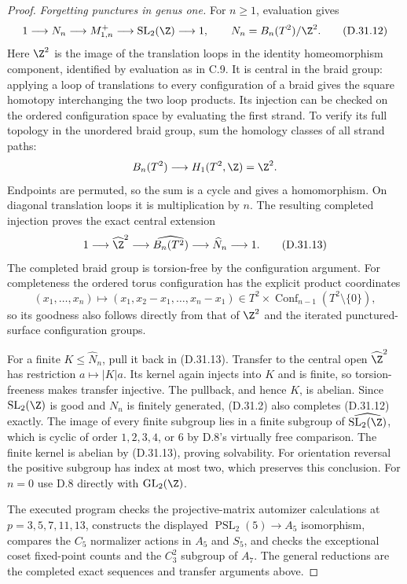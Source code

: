 \begin{proof}
\emph{Forgetting punctures in genus one.}
For $n\geq1$, evaluation gives
\[
 1\longrightarrow N_n\longrightarrow M_{1,n}^+
       \longrightarrow\operatorname{SL}_2(\Z)
       \longrightarrow1,\qquad
 N_n=B_n(T^2)/\Z^2.                                    \tag{D.31.12}
\]
Here $\Z^2$ is the image of the translation loops in the
identity homeomorphism component, identified by evaluation
as in C.9. It is central in the braid group: applying a loop
of translations to every configuration of a braid gives the
square homotopy interchanging the two loop products. Its injection
can be checked on the ordered configuration space by evaluating
the first strand. To verify its full topology in the unordered
braid group, sum the homology classes of all strand paths:
\[
 B_n(T^2)\longrightarrow H_1(T^2,\Z)=\Z^2.
\]
Endpoints are permuted, so the sum is a cycle and gives a
homomorphism. On diagonal translation loops it is multiplication
by $n$. The resulting completed injection proves the exact
central extension
\[
 1\longrightarrow\widehat\Z^2\longrightarrow
 \widehat{B_n(T^2)}\longrightarrow\widehat N_n
       \longrightarrow1.                              \tag{D.31.13}
\]
The completed braid group is torsion-free by the configuration
argument. For completeness the ordered torus configuration
has the explicit product coordinates
\[
 (x_1,\ldots,x_n)\longmapsto
 (x_1,x_2-x_1,\ldots,x_n-x_1)
 \in T^2\times\operatorname{Conf}_{n-1}(T^2\setminus\{0\}),
\]
so its goodness also follows directly from that of $\Z^2$
and the iterated punctured-surface configuration groups.

For a finite $K\leq\widehat N_n$, pull it back in (D.31.13).
Transfer to the central open $\widehat\Z^2$ has restriction
$a\mapsto |K|a$. Its kernel again injects into $K$ and is
finite, so torsion-freeness makes transfer injective.
The pullback, and hence $K$, is abelian. Since
$\operatorname{SL}_2(\Z)$ is good and $N_n$ is finitely
generated, (D.31.2) also completes (D.31.12) exactly.
The image of every finite subgroup lies in a finite subgroup
of $\widehat{\operatorname{SL}_2(\Z)}$, which is cyclic
of order $1,2,3,4$, or $6$ by D.8's virtually free comparison.
The finite kernel is abelian by (D.31.13), proving solvability.
For orientation reversal the positive subgroup has index at
most two, which preserves this conclusion. For $n=0$ use
D.8 directly with $\operatorname{GL}_2(\Z)$.

The executed program
checks the projective-matrix automizer calculations at
$p=3,5,7,11,13$, constructs the displayed
$\operatorname{PSL}_2(5)\to A_5$ isomorphism, compares
the $C_5$ normalizer actions in $A_5$ and $S_5$, and
checks the exceptional coset fixed-point counts and the
$C_3^2$ subgroup of $A_7$. The general reductions are
the completed exact sequences and transfer arguments above.
\end{proof}
